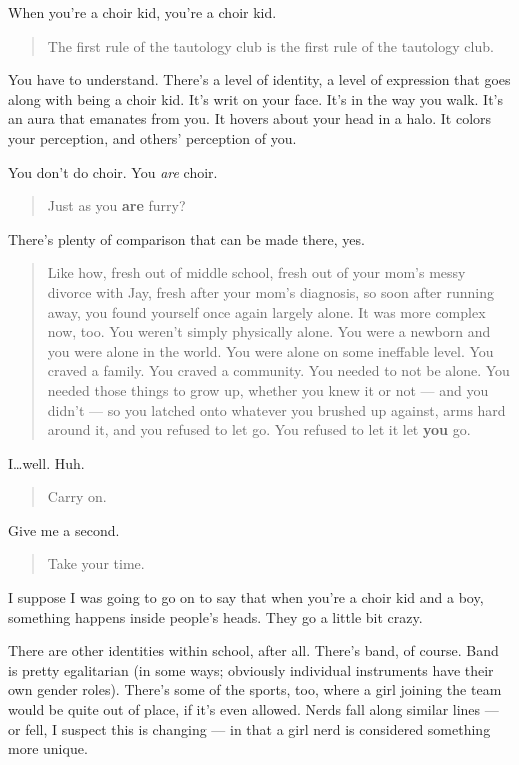 When you're a choir kid, you're a choir kid.

\begin{quote}
The first rule of the tautology club is the first rule of the tautology club.
\end{quote}

You have to understand. There's a level of identity, a level of expression that goes along with being a choir kid. It's writ on your face. It's in the way you walk. It's an aura that emanates from you. It hovers about your head in a halo. It colors your perception, and others' perception of you.

You don't do choir. You \emph{are} choir.

\begin{quote}
Just as you \textbf{are} furry?
\end{quote}

There's plenty of comparison that can be made there, yes.

\begin{quote}
Like how, fresh out of middle school, fresh out of your mom's messy divorce with Jay, fresh after your mom's diagnosis, so soon after running away, you found yourself once again largely alone. It was more complex now, too. You weren't simply physically alone. You were a newborn and you were alone in the world. You were alone on some ineffable level. You craved a family. You craved a community. You needed to not be alone. You needed those things to grow up, whether you knew it or not --- and you didn't --- so you latched onto whatever you brushed up against, arms hard around it, and you refused to let go. You refused to let it let \textbf{you} go.
\end{quote}

I\ldots{}well. Huh.

\begin{quote}
Carry on.
\end{quote}

Give me a second.

\begin{quote}
Take your time.
\end{quote}

I suppose I was going to go on to say that when you're a choir kid and a boy, something happens inside people's heads. They go a little bit crazy.

There are other identities within school, after all. There's band, of course. Band is pretty egalitarian (in some ways; obviously individual instruments have their own gender roles). There's some of the sports, too, where a girl joining the team would be quite out of place, if it's even allowed. Nerds fall along similar lines --- or fell, I suspect this is changing --- in that a girl nerd is considered something more unique.


